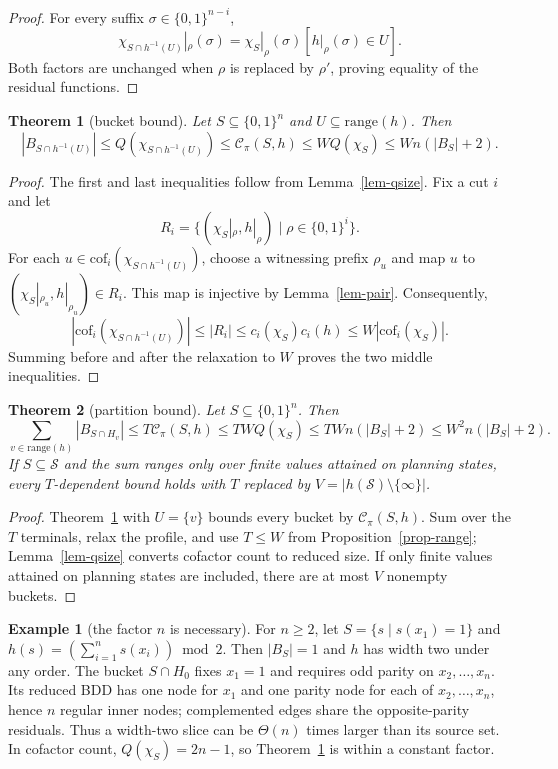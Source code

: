 \documentclass[letterpaper]{article}
\newcommand{\states}{\ensuremath{\mathcal{S}}}
\newcommand{\bddsize}[1]{\ensuremath{|B_{#1}|}}
\newcommand{\cofcount}{\ensuremath{Q}}
\newcommand{\cutcount}[2]{\ensuremath{c_{#1}(#2)}}
\newcommand{\cutprod}[2]{\ensuremath{\mathcal{C}_{\pi}(#1,#2)}}
\newcommand{\values}{\ensuremath{V}}
\newcommand{\level}[2]{\ensuremath{H_{#2}}}
\newcommand{\sub}[2]{\ensuremath{\mathrm{cof}_{#1}(#2)}}
\newcommand{\hrange}{\ensuremath{\mathrm{range}}}
\theoremstyle{plain}
\newtheorem{theorem}{Theorem}
\theoremstyle{definition}
\newtheorem{example}{Example}
\theoremstyle{remark}
\begin{document}
\begin{proof}
For every suffix $\sigma\in\{0,1\}^{n-i}$,
\[
 \chi_{S\cap h^{-1}(U)}|_\rho(\sigma)
 =\chi_S|_\rho(\sigma)[h|_\rho(\sigma)\in U].
\]
Both factors are unchanged when $\rho$ is replaced by $\rho'$, proving
equality of the residual functions.
\end{proof}

\begin{theorem}[bucket bound]
\label{thm-bucket}
Let $S\subseteq\{0,1\}^n$ and $U\subseteq\hrange(h)$. Then
\[
\bddsize{S\cap h^{-1}(U)}
\leq\cofcount(\chi_{S\cap h^{-1}(U)})
\leq\cutprod{S}{h}
\leq W\cofcount(\chi_S)
\leq Wn(\bddsize{S}+2).
\]
\end{theorem}

\begin{proof}
The first and last inequalities follow from Lemma~\ref{lem-qsize}. Fix a
cut $i$ and let
\[
 R_i=\{(\chi_S|_\rho,h|_\rho)\mid\rho\in\{0,1\}^i\}.
\]
For each $u\in\sub{i}{\chi_{S\cap h^{-1}(U)}}$, choose a witnessing
prefix $\rho_u$ and map $u$ to
$(\chi_S|_{\rho_u},h|_{\rho_u})\in R_i$. This map is injective by
Lemma~\ref{lem-pair}. Consequently,
\[
 |\sub{i}{\chi_{S\cap h^{-1}(U)}}|
 \leq|R_i|
 \leq\cutcount{i}{\chi_S}\cutcount{i}{h}
 \leq W|\sub{i}{\chi_S}|.
\]
Summing before and after the relaxation to $W$ proves the two middle
inequalities.
\end{proof}

\begin{theorem}[partition bound]
\label{thm-partition}
Let $S\subseteq\{0,1\}^n$. Then
\[
 \sum_{v\in\hrange(h)}\bddsize{S\cap\level{h}{v}}
 \leq T\cutprod{S}{h}
 \leq TW\cofcount(\chi_S)
 \leq TWn(\bddsize{S}+2)
 \leq W^2n(\bddsize{S}+2).
\]
If $S\subseteq\states$ and the sum ranges only over finite values attained
on planning states, every $T$-dependent bound holds with $T$ replaced by
$\values=|h(\states)\setminus\{\infty\}|$.
\end{theorem}

\begin{proof}
Theorem~\ref{thm-bucket} with $U=\{v\}$ bounds every bucket by
$\cutprod{S}{h}$. Sum over the $T$ terminals, relax the profile, and use
$T\leq W$ from Proposition~\ref{prop-range}; Lemma~\ref{lem-qsize}
converts cofactor count to reduced size. If only finite values attained on
planning states are included, there are at most $\values$ nonempty
buckets.
\end{proof}

\begin{example}[the factor $n$ is necessary]
\label{ex-parity}
For $n\geq2$, let $S=\{s\mid s(x_1)=1\}$ and
$h(s)=(\sum_{i=1}^ns(x_i))\bmod2$. Then $\bddsize{S}=1$ and $h$ has
width two under any order. The bucket $S\cap\level{h}{0}$ fixes
$x_1=1$ and requires odd parity on $x_2,\ldots,x_n$. Its reduced BDD has
one node for $x_1$ and one parity node for each of
$x_2,\ldots,x_n$, hence $n$ regular inner nodes; complemented edges share
the opposite-parity residuals. Thus a width-two slice can be
$\Theta(n)$ times larger than its source set. In cofactor count,
$\cofcount(\chi_S)=2n-1$, so Theorem~\ref{thm-bucket} is within a
constant factor.
\end{example}
\end{document}

